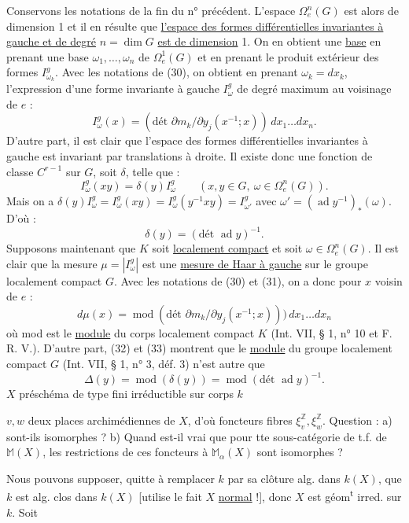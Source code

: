 Conservons les notations de la fin du n° précédent. L'espace $\Omega_e^n(G)$ est alors
de dimension 1 et il en résulte que \uline{l'espace des formes différentielles invariantes
à gauche et de degré} $n=\dim G$ \uline{est de dimension} 1. On en obtient une \uline{base} en
prenant une base $\omega_1,\ldots,\omega_n$ de $\Omega_e^1(G)$ et en prenant le produit extérieur des
formes $I_{\omega_k}^g$. Avec les notations de (30), on obtient en prenant $\omega_k=dx_k$, l'expression
d'une forme invariante à gauche $I_\omega^g$ de degré maximum au voisinage de $e$ :
\[
\tag{31} I_\omega^g(x)=(\text{dét }\partial m_k/\partial y_j(x^{-1};x))\,dx_1\ldots dx_n.
\]
D'autre part, il est clair que l'espace des formes différentielles invariantes
à gauche est invariant par translations à droite. Il existe donc une fonction de
classe $C^{r-1}$ sur $G$, soit $\delta$, telle que :
\[
\tag{32} I_\omega^g(xy)=\delta(y)I_\omega^g\qquad(x,y\in G,\ \omega\in\Omega_e^n(G)).
\]
Mais on a $\delta(y)I_\omega^g=I_\omega^g(xy)=I_\omega^g(y^{-1}xy)=I_{\omega'}^g$ avec $\omega'=(\operatorname{ad}y^{-1})_*(\omega)$. D'où :
\[
\tag{33} \delta(y)=(\text{dét }\operatorname{ad}y)^{-1}.
\]
Supposons maintenant que $K$ soit \uline{localement compact} et soit $\omega\in\Omega_e^n(G)$.
Il est clair que la mesure $\mu=|I_\omega^g|$ est une \uline{mesure de Haar à gauche} sur le groupe
localement compact $G$. Avec les notations de (30) et (31), on a donc pour $x$ voisin
de $e$ :
\[
\tag{34} d\mu(x)=\operatorname{mod}(\text{dét }\partial m_k/\partial y_j(x^{-1};x)))\,dx_1\ldots dx_n
\]
où mod est le \uline{module} du corps localement compact $K$ (Int. VII, § 1, n° 10 et F. R. V.).
D'autre part, (32) et (33) montrent que le \uline{module} du groupe localement compact $G$
(Int. VII, § 1, n° 3, déf. 3) n'est autre que
\[
\tag{35} \Delta(y)=\operatorname{mod}(\delta(y))=\operatorname{mod}(\text{dét }\operatorname{ad}y)^{-1}.
\]
$X$  préschéma de type fini  irréductible sur corps $k$

$v,w$ deux places archimédiennes de  $X$, d'où
foncteurs fibres $\xi_v^{\mathbb Z},\xi_w^{\mathbb Z}$. Question : a)  sont-ils
isomorphes ? b)  Quand est-il
vrai que pour tte sous-catégorie  de t.f. de
$\mathbb M(X)$, les restrictions de ces foncteurs à
$\mathbb M_\alpha(X)$ sont isomorphes ?

Nous pouvons supposer, quitte à remplacer $k$ par
sa clôture alg. dans $k(X)$, que $k$ est alg.
clos dans $k(X)$ [utilise le fait $X$ \uline{normal} !],
donc $X$ est géom\textsuperscript{t} irred. sur $k$. Soit 

